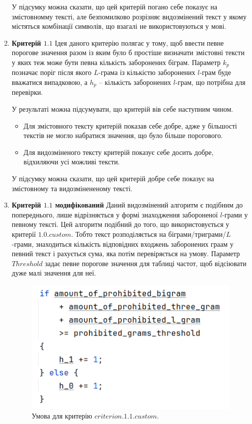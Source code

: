 \begin{enumerate}
        У підсумку можна сказати, що цей критерій погано себе показує на змістовномму тексті, але безпомилково розрізняє видозмінений текст у якому містяться комбінації символів, що взагалі не використовуються у мові.
        
    \item \textbf{Критерій $1.1$}
        Ідея даного критерію полягає у тому, щоб ввести певне порогове значення разом із яким було б простіше визначати змістовні тексти у яких теж може бути певна кількість заборонених біграм. Параметр $k_p$ позначає поріг після якого $L$-грама із кількістю заборонених $l$-грам буде вважатися випадковою, а $h_p$ -- кількість заборонених $l$-грам, що потрібна для перевірки.

         У результаті можна підсумувати, що критерій вів себе наступним чином.
        \begin{itemize}
            \item Для змістовного тексту критерій показав себе добре, адже у більшості текстів не могло набратися значення, що було більше порогового. 
            \item Для видозміненого тексту критерій показує себе досить добре, відхиляючи усі можливі тексти. 
        \end{itemize}

        У підсумку можна сказати, що цей критерій добре себе показує на змістовному та видозмінененому тексті. 
            
    \item \textbf{Критерій $1.1$ модифікований}
        Даний видозмінений алгоритм є подібним до попереднього, лише відрізняється у формі знаходження забороненої $l$-грами у певному тексті. Цей алгоритм подібний до того, що використовується у критерії $1.0.custom$. Тобто текст розподіляється на біграми/триграми/$L$-грами, знаходиться кількість відповідних входжень заборонених граам у певний текст і рахується сума, яка потім перевіряється на умову. Параметр $Threshold$ задає певне порогове значення для таблиці частот, щоб відсіювати дуже малі значення для неї.

        \begin{figure}[!h]
            \centering
            \includegraphics[width=0.5\linewidth]{Images/criterion_1_1_custom.png}
            \caption{Умова для критерію $criterion.1.1.custom$.}
            \label{fig:enter-label}
        \end{figure}


\end{enumerate}
